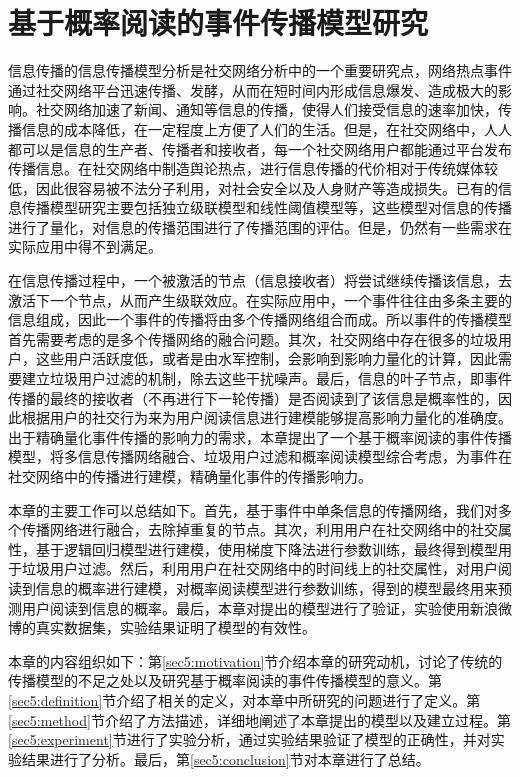 \chapter{基于概率阅读的事件传播模型研究}
\label{chap5:main}
信息传播的信息传播模型分析是社交网络分析中的一个重要研究点，网络热点事件通过社交网络平台迅速传播、发酵，从而在短时间内形成信息爆发、造成极大的影响。社交网络加速了新闻、通知等信息的传播，使得人们接受信息的速率加快，传播信息的成本降低，在一定程度上方便了人们的生活。但是，在社交网络中，人人都可以是信息的生产者、传播者和接收者，每一个社交网络用户都能通过平台发布传播信息。在社交网络中制造舆论热点，进行信息传播的代价相对于传统媒体较低，因此很容易被不法分子利用，对社会安全以及人身财产等造成损失。已有的信息传播模型研究主要包括独立级联模型和线性阈值模型等，这些模型对信息的传播进行了量化，对信息的传播范围进行了传播范围的评估。但是，仍然有一些需求在实际应用中得不到满足。

在信息传播过程中，一个被激活的节点（信息接收者）将尝试继续传播该信息，去激活下一个节点，从而产生级联效应。在实际应用中，一个事件往往由多条主要的信息组成，因此一个事件的传播将由多个传播网络组合而成。所以事件的传播模型首先需要考虑的是多个传播网络的融合问题。其次，社交网络中存在很多的垃圾用户，这些用户活跃度低，或者是由水军控制，会影响到影响力量化的计算，因此需要建立垃圾用户过滤的机制，除去这些干扰噪声。最后，信息的叶子节点，即事件传播的最终的接收者（不再进行下一轮传播）是否阅读到了该信息是概率性的，因此根据用户的社交行为来为用户阅读信息进行建模能够提高影响力量化的准确度。出于精确量化事件传播的影响力的需求，本章提出了一个基于概率阅读的事件传播模型，将多信息传播网络融合、垃圾用户过滤和概率阅读模型综合考虑，为事件在社交网络中的传播进行建模，精确量化事件的传播影响力。

本章的主要工作可以总结如下。首先，基于事件中单条信息的传播网络，我们对多个传播网络进行融合，去除掉重复的节点。其次，利用用户在社交网络中的社交属性，基于逻辑回归模型进行建模，使用梯度下降法进行参数训练，最终得到模型用于垃圾用户过滤。然后，利用用户在社交网络中的时间线上的社交属性，对用户阅读到信息的概率进行建模，对概率阅读模型进行参数训练，得到的模型最终用来预测用户阅读到信息的概率。最后，本章对提出的模型进行了验证，实验使用新浪微博的真实数据集，实验结果证明了模型的有效性。

本章的内容组织如下：第\ref{sec5:motivation}节介绍本章的研究动机，讨论了传统的传播模型的不足之处以及研究基于概率阅读的事件传播模型的意义。第\ref{sec5:definition}节介绍了相关的定义，对本章中所研究的问题进行了定义。第\ref{sec5:method}节介绍了方法描述，详细地阐述了本章提出的模型以及建立过程。第\ref{sec5:experiment}节进行了实验分析，通过实验结果验证了模型的正确性，并对实验结果进行了分析。最后，第\ref{sec5:conclusion}节对本章进行了总结。
